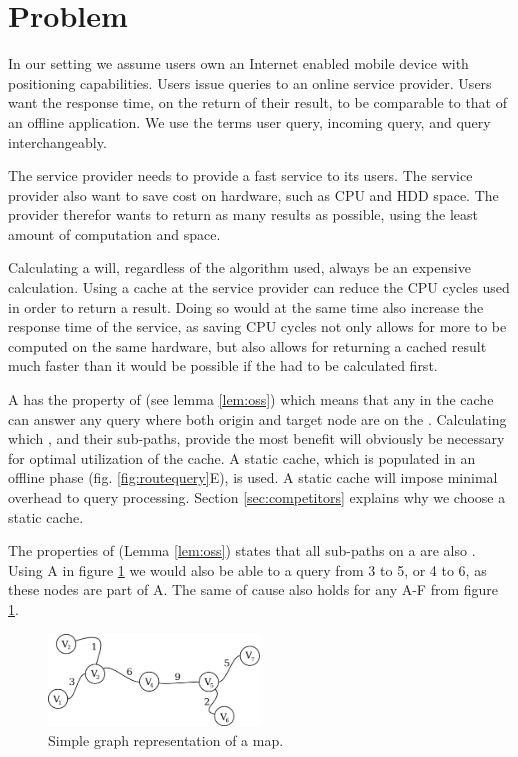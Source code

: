 \section{Problem}\label{sec:problem}

In our setting we assume users own an Internet enabled mobile device with positioning capabilities. Users issue \spath queries to an online service provider. Users want the response time, on the return of their \spath result, to be comparable to that of an offline application. We use the terms user query, incoming query, and query interchangeably.

The \spath service provider needs to provide a fast service to its users. The service provider also want to save cost on hardware, such as CPU and HDD space. The \spath provider therefor wants to return as many \spath results as possible, using the least amount of computation and space.

Calculating a \spath will, regardless of the algorithm used, always be an expensive calculation\cite{CNeed}. Using a \spath cache at the \spath service provider can reduce the CPU cycles used in order to return a \spath result. Doing so would at the same time also increase the response time of the \spath service, as saving CPU cycles not only allows for more \spaths to be computed on the same hardware, but also allows for returning a cached result much faster than it would be possible if the \spath had to be calculated first.

A \spath has the property of \oss (see lemma \ref{lem:oss}) which means that any \spath in the cache can answer any \spath query where both origin and target node are on the \spathns. Calculating which \spathsns, and their sub-paths, provide the most benefit will obviously be necessary for optimal utilization of the cache. A static cache, which is populated in an offline phase (fig. \ref{fig:routequery}E), is used. A static cache will impose minimal overhead to query processing. Section \ref{sec:competitors} explains why we choose a static cache.

The properties of \ossns (Lemma \ref{lem:oss}) states that all sub-paths on a \spath are also \spathsns. Using \spath A in figure \ref{fig:rxmap} we would also be able to a query from 3 to 5, or 4 to 6, as these nodes are part of \spath A. The same of cause also holds for any \spath A-F from figure \ref{fig:rxmap}.

\begin{figure}[hbt]
  \center
        \includegraphics[width=0.5\textwidth]{figures/rxmap}
        \caption{Simple graph representation of a map.}
  \label{fig:rxmap}
\end{figure}


